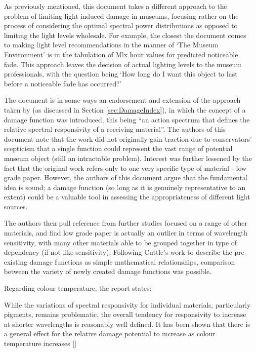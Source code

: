 As previously mentioned, this document takes a different approach to the problem of limiting light induced damage in museums, focusing rather on the process of considering the optimal spectral power distributions as opposed to limiting the light levels wholesale. For example, the closest the document comes to making light level recommendations in the manner of `The Museum Environment' \citep{thomson_museum_1986} is in the tabulation of Mlx hour values for predicted noticeable fade. This approach leaves the decision of actual lighting levels to the museum professionals, with the question being `How long do I want this object to last before a noticeable fade has occurred?'

The document is in some ways an endorsement and extension of the approach taken by \citet{harrison_report_1953} (as discussed in Section \ref{sec:DamageIndex}), in which the concept of a damage function was introduced, this being ``an action spectrum that defines the relative spectral responsivity of a receiving material''. The authors of this document note that the work did not originally gain traction due to conservators' scepticism that a single function could represent the vast range of potential museum object (still an intractable problem). Interest was further lessened by the fact that the original work refers only to one very specific type of material - low grade paper. However, the authors of this document argue that the fundamental idea is sound; a damage function (so long as it is genuinely representative to an extent) could be a valuable tool in assessing the appropriateness of different light sources.

The authors then pull reference from further studies focused on a range of other materials, and find low grade paper is actually an outlier in terms of wavelength sensitivity, with many other materials able to be grouped together in type of dependency (if not like sensitivity). Following Cuttle's work \citep{cuttle_lighting_1988} to describe the pre-existing damage functions as simple mathematical relationships, comparison between the variety of newly created damage functions was possible.

Regarding colour temperature, the report states:

\begin{itquote}{}
While the variations of spectral responsivity for individual materials, particularly pigments, remains problematic, the overall tendency for responsivity to increase at shorter wavelengths is reasonably well defined. It has been shown that there is a general effect for the relative damage potential to increase as colour temperature increases [\citet{cuttle_lighting_1988}]
\end{itquote}

